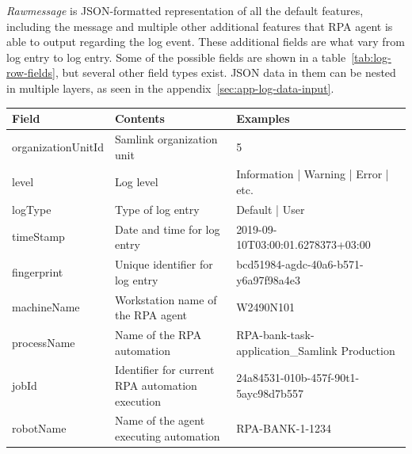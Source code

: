 \textit{Rawmessage} is JSON-formatted representation
of all the default features,
including the message
and multiple other additional features
that RPA agent is able to output regarding the log event.
These additional fields are what vary from log entry to log entry.
Some of the possible fields are shown in a table~\ref{tab:log-row-fields},
but several other field types exist.
JSON data in them can be nested in multiple layers,
as seen in the appendix~\ref{sec:app-log-data-input}.

\begin{table}[]
    \centering
    \begin{tabular}{|L{0.25\textwidth}|L{0.25\textwidth}|L{0.5\textwidth}|}
        \hline
        \textbf{Field}    & \textbf{Contents}                               & \textbf{Examples}                                                             \\ \hline
        organizationUnitId & Samlink organization unit                       & 5                                                                            \\ \hline
        level              & Log level                                       & Information | Warning | Error | etc.                                         \\ \hline
        logType            & Type of log entry                               & Default | User                                                               \\ \hline
        timeStamp          & Date and time for log entry                     & 2019-09-10T03:00:01.6278373+03:00                                            \\ \hline
        fingerprint        & Unique identifier for log entry                 & bcd51984-agdc-40a6-b571-y6a97f98a4e3                                         \\ \hline
        machineName        & Workstation name of the RPA agent               & W2490N101                                                                   \\ \hline
        processName        & Name of the RPA automation                      & RPA-bank-task-application\_Samlink Production                      \\ \hline
        jobId              & Identifier for current RPA automation execution & 24a84531-010b-457f-90t1-5ayc98d7b557                                         \\ \hline
        robotName          & Name of the agent executing automation          & RPA-BANK-1-1234                                                              \\ \hline

\end{tabular}
\end{table}

